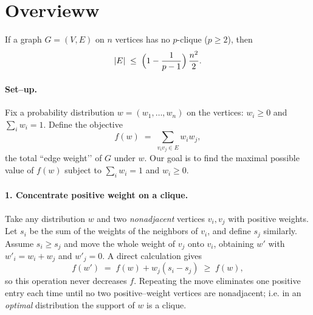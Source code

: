 %

\newcommand{\supp}{\operatorname{supp}}
\newcommand{\vp}{\operatorname{vp}}
\newcommand{\Inc}{\mathrm{Inc}}
\newcommand{\other}{\operatorname{other}}
\newcommand{\fw}{f} 

\section{Overvieww}\label{sec:overview}

\begin{theorem}\label{thm:turan}
If a graph $G=(V,E)$ on $n$ vertices has no $p$-clique ($p\ge 2$), then
\[
|E| \;\le\; \Bigl(1-\frac{1}{p-1}\Bigr)\,\frac{n^2}{2}.
\]
\end{theorem}

\paragraph{Set–up.}
Fix a probability distribution $w=(w_1,\dots,w_n)$ on the vertices:
$w_i\ge 0$ and $\sum_i w_i=1$.  Define the objective
\[
  f(w)\;=\; \sum_{v_iv_j\in E} w_i w_j,
\]
the total “edge weight’’ of $G$ under $w$.  Our goal is to find the maximal possible
value of $f(w)$ subject to $\sum_i w_i=1$ and $w_i\ge 0$.

\paragraph{1. Concentrate positive weight on a clique.}
Take any distribution $w$ and two \emph{nonadjacent} vertices $v_i,v_j$
with positive weights.  Let $s_i$ be the sum of the weights of the
neighbors of $v_i$, and define $s_j$ similarly.  Assume $s_i\ge s_j$ and
move the whole weight of $v_j$ onto $v_i$, obtaining $w'$ with
$w'_i=w_i+w_j$ and $w'_j=0$.  A direct calculation gives
\[
  f(w') \;=\; f(w) + w_j(s_i-s_j)\;\ge\; f(w),
\]
so this operation never decreases $f$.  Repeating the move eliminates one
positive entry each time until no two positive–weight vertices are
nonadjacent; i.e. in an \emph{optimal} distribution the support of $w$ is a
clique.

